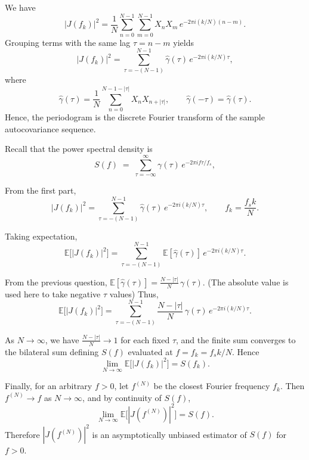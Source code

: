 \documentclass[11pt]{article}
\begin{document}
\begin{solution}
We have
\begin{equation}
|J(f_k)|^2 
= \frac{1}{N}\sum_{n=0}^{N-1}\sum_{m=0}^{N-1}
X_n X_m\, e^{-2\pi i (k/N)(n-m)}.
\end{equation}
Grouping terms with the same lag $\tau = n-m$ yields
\begin{equation}
|J(f_k)|^2 
= \sum_{\tau=-(N-1)}^{N-1} 
\hat{\gamma}(\tau)\, e^{-2\pi i (k/N)\tau},
\end{equation}
where 
\begin{equation}
\hat{\gamma}(\tau)
= \frac{1}{N}\sum_{n=0}^{N-1-|\tau|} X_n X_{n+|\tau|},
\qquad
\hat{\gamma}(-\tau)=\hat{\gamma}(\tau).
\end{equation}
Hence, the periodogram is the discrete Fourier transform of the sample autocovariance sequence.

Recall that the power spectral density is
\begin{equation}
S(f) \;=\; \sum_{\tau=-\infty}^{\infty} \gamma(\tau)\,
e^{-2\pi i f \tau / f_s},
\end{equation}

From the first part,
\begin{equation}
|J(f_k)|^2 
= \sum_{\tau=-(N-1)}^{N-1} 
\hat{\gamma}(\tau)\, e^{-2\pi i (k/N)\tau},
\qquad
f_k = \frac{f_s k}{N}.
\end{equation}

Taking expectation,
\begin{equation}
\mathbb{E}\big[ |J(f_k)|^2 \big]
= \sum_{\tau=-(N-1)}^{N-1} 
\mathbb{E}[\hat{\gamma}(\tau)]\, e^{-2\pi i (k/N)\tau}.
\end{equation}

From the previous question, $\mathbb{E}[\hat{\gamma}(\tau)]
= \frac{N-|\tau|}{N}\,\gamma(\tau)$. (The absolute value is used here to take negative $\tau$ values)
Thus,
\begin{equation}
\mathbb{E}\big[ |J(f_k)|^2 \big]
= \sum_{\tau=-(N-1)}^{N-1} 
\frac{N-|\tau|}{N}\,\gamma(\tau)\,
e^{-2\pi i (k/N)\tau}.
\end{equation}

As $N\to\infty$, we have $\frac{N-|\tau|}{N}\to 1$ for each fixed $\tau$, and
the finite sum converges to the bilateral sum defining $S(f)$ evaluated at 
$f = f_k = f_s k/N$. Hence
\begin{equation}
\lim_{N\to\infty} 
\mathbb{E}\big[ |J(f_k)|^2 \big]
= S(f_k).
\end{equation}

Finally, for an arbitrary $f>0$, let $f^{(N)}$ be the closest Fourier frequency
$f_k$. Then $f^{(N)} \to f$ as $N\to\infty$, and by continuity of $S(f)$,
\begin{equation}
\lim_{N\to\infty} 
\mathbb{E}\big[ |J(f^{(N)})|^2 \big]
= S(f).
\end{equation}
Therefore $|J(f^{(N)})|^2$ is an asymptotically unbiased estimator of $S(f)$
for $f>0$.

\end{solution}
\end{document}
